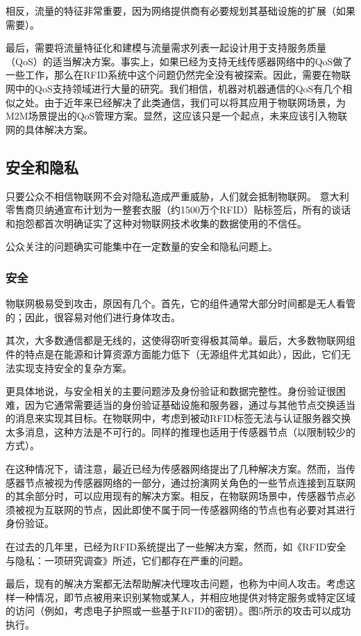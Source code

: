 \documentclass[12pt,a4paper]{article}%
\begin{document}
相反，流量的特征非常重要，因为网络提供商有必要规划其基础设施的扩展（如果需要）。

最后，需要将流量特征化和建模与流量需求列表一起设计用于支持服务质量（QoS）的适当解决方案。事实上，如果已经为支持无线传感器网络中的QoS做了一些工作，那么在RFID系统中这个问题仍然完全没有被探索。因此，需要在物联网中的QoS支持领域进行大量的研究。我们相信，机器对机器通信的QoS有几个相似之处。由于近年来已经解决了此类通信，我们可以将其应用于物联网场景，为M2M场景提出的QoS管理方案。显然，这应该只是一个起点，未来应该引入物联网的具体解决方案。
\subsection{安全和隐私}
只要公众不相信物联网不会对隐私造成严重威胁，人们就会抵制物联网。
意大利零售商贝纳通宣布计划为一整套衣服（约1500万个RFID）贴标签后，所有的谈话和抱怨都首次明确证实了这种对物联网技术收集的数据使用的不信任。

公众关注的问题确实可能集中在一定数量的安全和隐私问题上。
\subsubsection{安全}
物联网极易受到攻击，原因有几个。首先，它的组件通常大部分时间都是无人看管的；因此，很容易对他们进行身体攻击。

其次，大多数通信都是无线的，这使得窃听变得极其简单。最后，大多数物联网组件的特点是在能源和计算资源方面能力低下（无源组件尤其如此），因此，它们无法实现支持安全的复杂方案。

更具体地说，与安全相关的主要问题涉及身份验证和数据完整性。身份验证很困难，因为它通常需要适当的身份验证基础设施和服务器，通过与其他节点交换适当的消息来实现其目标。在物联网中，考虑到被动RFID标签无法与认证服务器交换太多消息，这种方法是不可行的。同样的推理也适用于传感器节点（以限制较少的方式）。

在这种情况下，请注意，最近已经为传感器网络提出了几种解决方案。然而，当传感器节点被视为传感器网络的一部分，通过扮演网关角色的一些节点连接到互联网的其余部分时，可以应用现有的解决方案。相反，在物联网场景中，传感器节点必须被视为互联网的节点，因此即使不属于同一传感器网络的节点也有必要对其进行身份验证。

在过去的几年里，已经为RFID系统提出了一些解决方案，然而，如《RFID安全与隐私：一项研究调查》所述，它们都存在严重的问题。

最后，现有的解决方案都无法帮助解决代理攻击问题，也称为中间人攻击。考虑这样一种情况，即节点被用来识别某物或某人，并相应地提供对特定服务或特定区域的访问（例如，考虑电子护照或一些基于RFID的密钥）。图5所示的攻击可以成功执行。
\end{document}

